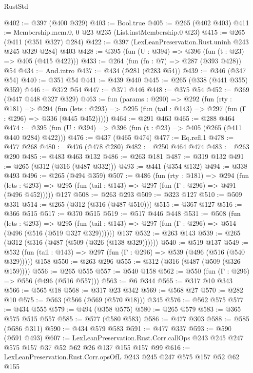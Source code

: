 \begin{lexlean}{RustStd}
\begin{coremodule}
{\begin{coremodule}
{{{{{{@402 := @397 (@400 @329)
@403 := Bool.true
@405 := @265 (@402 @403)
@411 := Membership.mem.{0, 0} @23 @235 (List.instMembership.{0} @23)
@415 := @265 (@411 (@351 @327) @284)
@422 := @397 (LexLeanPreservation.Rust.uninh @243 @245 @329 @284) @403
@428 := @395 (fun (U : @394) => @396 (fun (t : @23) => @405 (@415 @422)))
@433 := @264 (fun (fn : @7) => @287 (@393 @428)) @54
@434 := And.intro
@437 := @434 (@281 (@283 @54))
@439 := @346 (@347 @54)
@440 := @351 @54
@441 := @439 @440
@445 := @265 (@338 (@441 @355) @359)
@446 := @372 @54
@447 := @371 @446
@448 := @375 @54
@452 := @369 (@447 @448 @327 @329)
@463 := fun (params : @290) =>
  @292
    (fun (rty : @181) =>
    @294
      (fun (lets : @293) => @295 (fun (tail : @143) => @297 (fun (Γ : @296) => @336 (@445 @452)))))
@464 := @291 @463
@465 := @288 @464
@474 := @395 (fun (U : @394) => @396 (fun (t : @23) => @405 (@265 (@411 @440 @284) @422)))
@476 := @437 (@465 @474)
@477 := Eq.refl.{1}
@478 := @477 @268
@480 := @476 (@478 @280)
@482 := @250 @464 @474
@483 := @263 @290
@485 := @483 @463 @132
@486 := @263 @181
@487 := @319 @132
@491 := @265 (@312 (@316 (@487 @332)))
@493 := @441 (@354 @132)
@494 := @338 @493
@496 := @265 (@494 @359)
@507 := @486
    (fun (rty : @181) =>
    @294
      (fun (lets : @293) => @295 (fun (tail : @143) => @297 (fun (Γ : @296) => @491 (@496 @452)))))
    @127
@508 := @263 @293
@509 := @323 @127
@510 := @509 @331
@514 := @265 (@312 (@316 (@487 @510)))
@515 := @367 @127
@516 := @366 @515
@517 := @370 @515
@519 := @517 @446 @448
@531 := @508
    (fun (lets : @293) =>
    @295 (fun (tail : @143) => @297 (fun (Γ : @296) => @514 (@496 (@516 (@519 @327 @329))))))
    @137
@532 := @263 @143
@539 := @265 (@312 (@316 (@487 (@509 (@326 (@138 @329))))))
@540 := @519 @137
@549 := @532 (fun (tail : @143) => @297 (fun (Γ : @296) => @539 (@496 (@516 (@540 @329))))) @158
@550 := @263 @296
@555 := @312 (@316 (@487 (@509 (@326 @159))))
@556 := @265 @555
@557 := @540 @158
@562 := @550 (fun (Γ : @296) => @556 (@496 (@516 @557)))
@563 := @6 @344
@565 := @317 @10 @343
@566 := @565 @18
@568 := @317 @23 @342
@569 := @568 @27
@570 := @282 @10
@575 := @563 (@566 (@569 (@570 @18))) @345
@576 := @562 @575
@577 := @434 @555
@579 := @494 (@358 @575)
@580 := @265 @579
@583 := @365 @575 @515 @557
@585 := @577 (@580 @583)
@586 := @477 @303
@588 := @585 (@586 @311)
@590 := @434 @579 @583
@591 := @477 @337
@593 := @590 (@591 @493)
@607 := LexLeanPreservation.Rust.Corr.callOps
    @243
    @245
    @247
    @575
    @157
    @37
    @52
    @62
    @26
    @137
    @155
    @157
    @99
@616 := LexLeanPreservation.Rust.Corr.opsOfL @243 @245 @247 @575 @157 @52 @62 @155
}}}}}}
\end{coremodule}}
\end{coremodule}
\end{lexlean}
